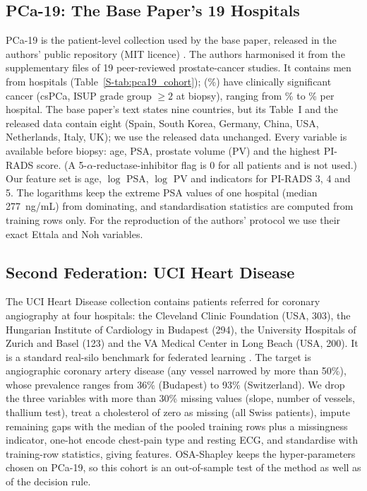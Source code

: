 \documentclass[journal]{IEEEtran}
\begin{document}
\subsection{PCa-19: The Base Paper's 19 Hospitals}
PCa-19 is the patient-level collection used by the base paper, released in the authors' public repository (MIT licence) \cite{Kazlouski2025HospitalParticipation}. The authors harmonised it from the supplementary files of 19 peer-reviewed prostate-cancer studies. It contains \pNineN{} men from \pNineHosp{} hospitals (Table~\ref{S-tab:pca19_cohort}); \pNinePos{} (\pNinePrev\%) have clinically significant cancer (csPCa, ISUP grade group $\geq 2$ at biopsy), ranging from \pNinePrevLo\% to \pNinePrevHi\% per hospital. The base paper's text states nine countries, but its Table~I and the released data contain eight (Spain, South Korea, Germany, China, USA, Netherlands, Italy, UK); we use the released data unchanged. Every variable is available before biopsy: age, PSA, prostate volume (PV) and the highest PI-RADS score. (A 5-$\alpha$-reductase-inhibitor flag is 0 for all patients and is not used.) Our feature set is age, $\log$ PSA, $\log$ PV and indicators for PI-RADS 3, 4 and 5. The logarithms keep the extreme PSA values of one hospital (median 277~ng/mL) from dominating, and standardisation statistics are computed from training rows only. For the reproduction of the authors' protocol we use their exact Ettala and Noh variables.



\subsection{Second Federation: UCI Heart Disease}
\label{sec:heart_data}
The UCI Heart Disease collection \cite{Janosi1988HeartDisease, Detrano1989Heart} contains \hrN{} patients referred for coronary angiography at four hospitals: the Cleveland Clinic Foundation (USA, 303), the Hungarian Institute of Cardiology in Budapest (294), the University Hospitals of Zurich and Basel (123) and the VA Medical Center in Long Beach (USA, 200). It is a standard real-silo benchmark for federated learning \cite{Terrail2022FLamby}. The target is angiographic coronary artery disease (any vessel narrowed by more than 50\%), whose prevalence ranges from 36\% (Budapest) to 93\% (Switzerland). We drop the three variables with more than 30\% missing values (slope, number of vessels, thallium test), treat a cholesterol of zero as missing (all Swiss patients), impute remaining gaps with the median of the pooled training rows plus a missingness indicator, one-hot encode chest-pain type and resting ECG, and standardise with training-row statistics, giving \hrFeat{} features. OSA-Shapley keeps the hyper-parameters chosen on PCa-19, so this cohort is an out-of-sample test of the method as well as of the decision rule.
\end{document}
